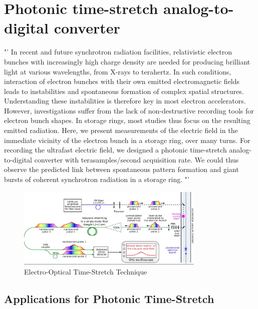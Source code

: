 \newpage 
\section{Photonic time-stretch analog-to-digital converter}










"' In recent and future synchrotron radiation facilities, relativistic electron bunches with increasingly high charge density are needed for producing brilliant light at various wavelengths, from X-rays to terahertz. In such conditions, interaction of electron bunches with their own emitted electromagnetic fields leads to instabilities and spontaneous formation of complex spatial structures. Understanding these instabilities is therefore key in most electron accelerators. However, investigations suffer from the lack of non-destructive recording tools for electron bunch shapes. In storage rings, most studies thus focus on the resulting emitted radiation. Here, we present measurements of the electric field in the immediate vicinity of the electron bunch in a storage ring, over many turns. For recording the ultrafast electric field, we designed a photonic time-stretch analog-to-digital converter with terasamples/second acquisition rate. We could thus observe the predicted link between spontaneous pattern formation and giant bursts of coherent synchrotron radiation in a storage ring. "'  \cite{Bielawski2019}

\begin{figure}[H]
	\centering
	\includegraphics[width = 0.8\textwidth]{chap/02-theory/img/EO.png}
	\caption{Electro-Optical Time-Stretch Technique \cite{Bielawski2019}}
	\label{fig:eo}
\end{figure}


\subsection{Applications for Photonic Time-Stretch}

